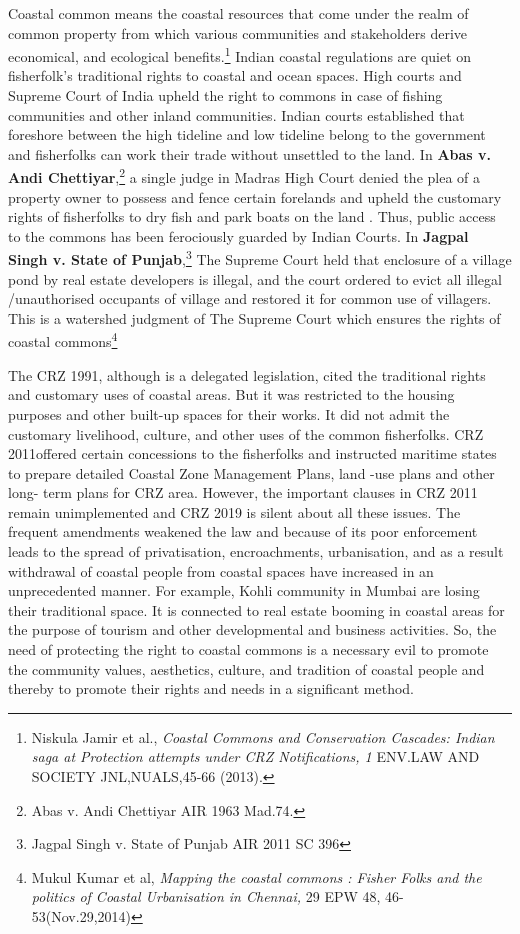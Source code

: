 \begin{multicols}{2}
\noi
Coastal common means the coastal resources that come under the realm of common property
from which various communities and stakeholders derive economical, and ecological
benefits.\footnote{Niskula Jamir et al., \textit{Coastal Commons and Conservation Cascades: Indian saga at Protection attempts under CRZ Notifications, 1} ENV.LAW AND SOCIETY JNL,NUALS,45-66 (2013).} Indian coastal regulations are quiet on fisherfolk’s traditional rights to coastal and
ocean spaces. High courts and Supreme Court of India upheld the right to commons in case
of fishing communities and other inland communities. Indian courts established that
foreshore between the high tideline and low tideline belong to the government and fisherfolks
can work their trade without unsettled to the land. In \textbf{Abas v. Andi Chettiyar},\footnote{Abas v. Andi Chettiyar AIR 1963 Mad.74.} a single
judge in Madras High Court denied the plea of a property owner to possess and fence certain
forelands and upheld the customary rights of fisherfolks to dry fish and park boats on the land
. Thus, public access to the commons has been ferociously guarded by Indian Courts. In
\textbf{Jagpal Singh v. State of Punjab},\footnote{Jagpal Singh v. State of Punjab AIR 2011 SC 396} The Supreme Court held that enclosure of a village pond
by real estate developers is illegal, and the court ordered to evict all illegal /unauthorised
occupants of village and restored it for common use of villagers. This is a watershed
judgment of The Supreme Court which ensures the rights of coastal commons\footnote{Mukul Kumar et al, \textit{Mapping the coastal commons : Fisher Folks and the politics of Coastal Urbanisation in Chennai,} 29 EPW 48, 46-53(Nov.29,2014)}

\noi
The CRZ 1991, although is a delegated legislation, cited the traditional rights and customary
uses of coastal areas. But it was restricted to the housing purposes and other built-up spaces
for their works. It did not admit the customary livelihood, culture, and other uses of the
common fisherfolks. CRZ 2011offered certain concessions to the fisherfolks and instructed
maritime states to prepare detailed Coastal Zone Management Plans, land -use plans and
other long- term plans for CRZ area. However, the important clauses in CRZ 2011 remain
unimplemented and CRZ 2019 is silent about all these issues. The frequent amendments
weakened the law and because of its poor enforcement leads to the spread of privatisation,
encroachments, urbanisation, and as a result withdrawal of coastal people from coastal spaces
have increased in an unprecedented manner. For example, Kohli community in Mumbai are
losing their traditional space. It is connected to real estate booming in coastal areas for the
purpose of tourism and other developmental and business activities. So, the need of
protecting the right to coastal commons is a necessary evil to promote the community values, aesthetics, culture, and tradition of coastal people and thereby to promote their rights and
needs in a significant method.


\end{multicols}
